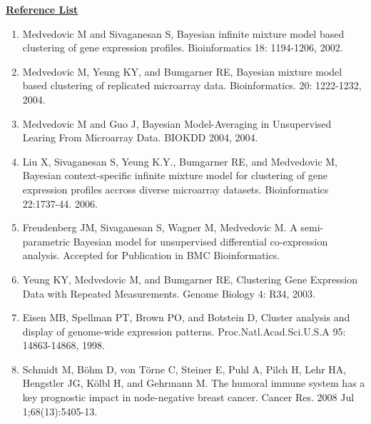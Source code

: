 \documentclass[12pt]{article}
\begin{document}
\begin{center}
\underline {\textbf{Reference List}}
\end{center}

\begin{enumerate}
\item Medvedovic M and Sivaganesan S, Bayesian infinite mixture model based clustering of gene expression profiles. Bioinformatics 18: 1194-1206, 2002.
\item Medvedovic M, Yeung KY, and Bumgarner RE, Bayesian mixture model based clustering of replicated microarray data. Bioinformatics. 20: 1222-1232, 2004.
\item Medvedovic M and Guo J, Bayesian Model-Averaging in Unsupervised Learing From Microarray Data. BIOKDD 2004, 2004.
\item Liu X, Sivaganesan S, Yeung K.Y., Bumgarner RE, and Medvedovic M, Bayesian context-specific infinite mixture model for clustering of gene expression profiles accross diverse microarray datasets. Bioinformatics 22:1737-44. 2006.
\item Freudenberg  JM, Sivaganesan S, Wagner M, Medvedovic M. A semi-parametric Bayesian model for unsupervised differential co-expression analysis. Accepted for Publication in BMC Bioinformatics.
\item Yeung KY, Medvedovic M, and Bumgarner RE, Clustering Gene Expression Data with Repeated Measurements. Genome Biology 4: R34, 2003.
\item Eisen MB, Spellman PT, Brown PO, and Botstein D, Cluster analysis and display of genome-wide expression patterns. Proc.Natl.Acad.Sci.U.S.A 95: 14863-14868, 1998.
\item Schmidt M, B\"ohm D, von T\"orne C, Steiner E, Puhl A, Pilch H, Lehr HA, Hengstler JG, K\"olbl H, and Gehrmann M. The humoral immune system has a key prognostic impact in node-negative breast cancer. Cancer Res. 2008 Jul 1;68(13):5405-13.
\end{enumerate}
\end{document}
